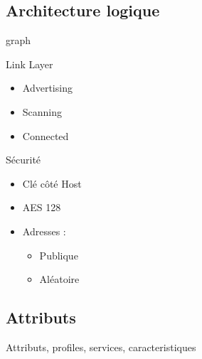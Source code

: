 \subsection{Architecture logique}
\begin{frame}

\begin{minipage}[t]{0.45\linewidth}
graph
\end{minipage}
\begin{minipage}[t]{0.45\linewidth}
	\begin{block}{Link Layer}
		\begin{itemize}
			\item Advertising
			\item Scanning
			\item Connected
		\end{itemize}
	\end{block}
	\begin{block}{Sécurité}
		\begin{itemize}
			\item Clé côté Host
			\item AES 128
			\item Adresses :
			\begin{itemize}
				\item Publique
				\item Aléatoire
			\end{itemize}
		\end{itemize}
	\end{block}
\end{minipage}
\end{frame}

\subsection{Attributs}
\begin{frame}
Attributs, profiles, services, caracteristiques
\end{frame}


